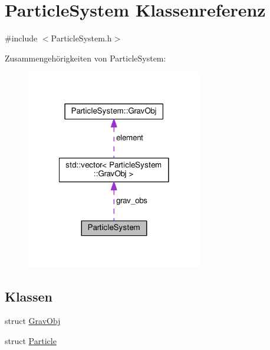 \hypertarget{classParticleSystem}{\section{Particle\-System Klassenreferenz}
\label{classParticleSystem}
}


{\ttfamily \#include $<$Particle\-System.\-h$>$}



Zusammengehörigkeiten von Particle\-System\-:
\nopagebreak
\begin{figure}[H]
\begin{center}
\leavevmode
\includegraphics[width=218pt]{classParticleSystem__coll__graph}
\end{center}
\end{figure}
\subsection*{Klassen}
\begin{DoxyCompactItemize}
\item 
struct \hyperlink{structParticleSystem_1_1GravObj}{Grav\-Obj}
\item 
struct \hyperlink{structParticleSystem_1_1Particle}{Particle}
\end{DoxyCompactItemize}
